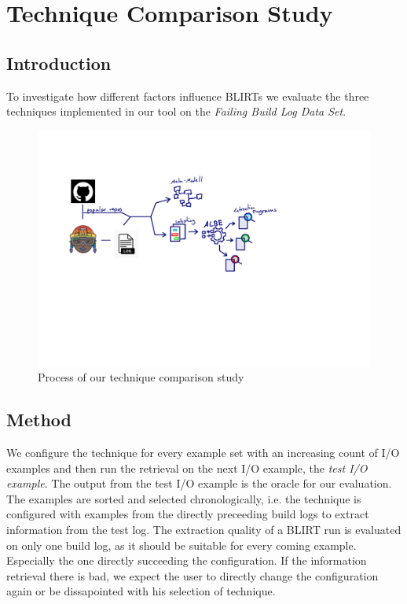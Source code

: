 \documentclass[\myrootdir/main.tex]{subfiles}
\begin{document}
\chapter{Technique Comparison Study}
\label{sec:study}
\section{Introduction}
To investigate how different factors  influence BLIRTs we evaluate the three techniques implemented in our tool on the \emph{Failing Build Log Data Set}.

\begin{figure}[htbp]
	\centering
	\includegraphics[page=6, width=\textwidth, trim={0.5cm 0.5cm 0.5cm 0.5cm}, clip]{img/flow-of-research.pdf}
	\caption{Process of our technique comparison study}
	\label{fig:study}
\end{figure}

\section{Method}
We configure the technique for every example set with an increasing count of I/O examples and then run the retrieval on the next I/O example, the \emph{test I/O example}.
The output from the test I/O example is the oracle for our evaluation.
The examples are sorted and selected chronologically, i.e. the technique is configured with examples from the directly preceeding build logs to extract information from the test log.
The extraction quality of a BLIRT run is evaluated on only one build log, as it should be suitable for every coming example.
Especially the one directly succeeding the configuration.
If the information retrieval there is bad, we expect the user to directly change the configuration again or be dissapointed with his selection of technique.
\end{document}
